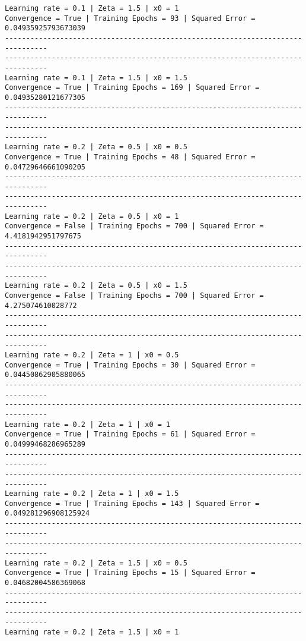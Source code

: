 \documentclass[11pt]{article}
\begin{document}
\begin{Verbatim}[commandchars=\\\{\}]
Learning rate = 0.1 | Zeta = 1.5 | x0 = 1
Convergence = True | Training Epochs = 93 | Squared Error = 0.04935925793673039
--------------------------------------------------------------------------------
--------------------------------------------------------------------------------
Learning rate = 0.1 | Zeta = 1.5 | x0 = 1.5
Convergence = True | Training Epochs = 169 | Squared Error = 0.04935280121677305
--------------------------------------------------------------------------------
--------------------------------------------------------------------------------
Learning rate = 0.2 | Zeta = 0.5 | x0 = 0.5
Convergence = True | Training Epochs = 48 | Squared Error = 0.04729646661090205
--------------------------------------------------------------------------------
--------------------------------------------------------------------------------
Learning rate = 0.2 | Zeta = 0.5 | x0 = 1
Convergence = False | Training Epochs = 700 | Squared Error = 4.4181942951797675
--------------------------------------------------------------------------------
--------------------------------------------------------------------------------
Learning rate = 0.2 | Zeta = 0.5 | x0 = 1.5
Convergence = False | Training Epochs = 700 | Squared Error = 4.275074610028772
--------------------------------------------------------------------------------
--------------------------------------------------------------------------------
Learning rate = 0.2 | Zeta = 1 | x0 = 0.5
Convergence = True | Training Epochs = 30 | Squared Error = 0.04450862905880065
--------------------------------------------------------------------------------
--------------------------------------------------------------------------------
Learning rate = 0.2 | Zeta = 1 | x0 = 1
Convergence = True | Training Epochs = 61 | Squared Error = 0.04999468286965289
--------------------------------------------------------------------------------
--------------------------------------------------------------------------------
Learning rate = 0.2 | Zeta = 1 | x0 = 1.5
Convergence = True | Training Epochs = 143 | Squared Error =
0.049281296908125924
--------------------------------------------------------------------------------
--------------------------------------------------------------------------------
Learning rate = 0.2 | Zeta = 1.5 | x0 = 0.5
Convergence = True | Training Epochs = 15 | Squared Error = 0.04682004586369068
--------------------------------------------------------------------------------
--------------------------------------------------------------------------------
Learning rate = 0.2 | Zeta = 1.5 | x0 = 1

\end{Verbatim}
\end{document}
